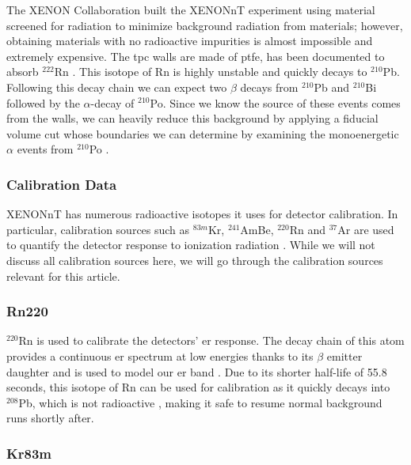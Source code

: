 The XENON Collaboration built the XENONnT experiment using material screened for radiation to minimize background radiation from materials; however, obtaining materials with no radioactive impurities is almost impossible and extremely expensive. The \gls{tpc} walls are made of \gls{ptfe}, has been documented to absorb $^{222}$Rn \cite{Rn222_decay_chain}. This isotope of Rn is highly unstable and quickly decays to $^{210}$Pb. Following this decay chain we can expect two $\beta$ decays from $^{210}$Pb and $^{210}$Bi followed by the $\alpha$-decay of $^{210}$Po. Since we know the source of these events comes from the walls, we can heavily reduce this background by applying a fiducial volume cut whose boundaries we can determine by examining the monoenergetic $\alpha$ events from $^{210}$Po \cite{PhysRevD.111.103040}.

\subsubsection{Calibration Data}

XENONnT has numerous radioactive isotopes it uses for detector calibration. In particular, calibration sources such as $^{83m}$Kr, $^{241}$AmBe, $^{220}$Rn and $^{37}$Ar are used to quantify the detector response to ionization radiation \cite{xenoncollaboration2024xenonntanalysissignalreconstruction}.  While we will not discuss all calibration sources here, we will go through the calibration sources relevant for this article.

\subsubsection*{Rn220}

$^{220}$Rn is used to calibrate the detectors' \gls{er} response. The decay chain of this atom provides a continuous \gls{er} spectrum at low energies thanks to its $\beta$ emitter daughter and is used to model our \gls{er} band \cite{Lang:2016zde, xenoncollaboration2024xenonntanalysissignalreconstruction}. Due to its shorter half-life of 55.8\,seconds, this isotope of Rn can be used for calibration as it quickly decays into $^{208}$Pb, which is not radioactive \cite{Murra:2022mlr}, making it safe to resume normal background runs shortly after.

\subsubsection*{Kr83m}

